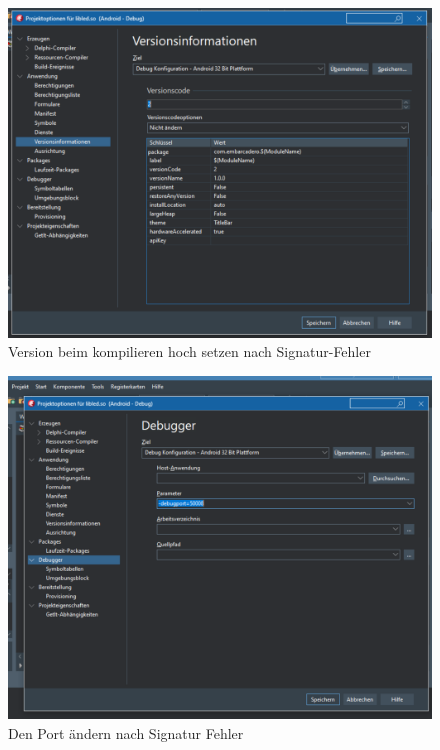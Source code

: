 \begin{figure}[h]
\begin{center}
\includegraphics[width=15cm]{img/version.png}
\caption{Version beim kompilieren hoch setzen nach Signatur-Fehler}
\label{version}
\end{center}
\end{figure}

\begin{figure}[h]
\begin{center}
\includegraphics[width=15cm]{img/port.png}
\caption{Den Port ändern nach Signatur Fehler}
\label{port}
\end{center}
\end{figure}

